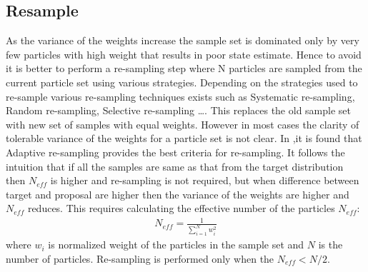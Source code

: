 \subsection{Resample}
As the variance of the weights increase the sample set is dominated only by very few particles with high weight that results in poor state estimate. Hence to avoid it is better to perform a re-sampling step where N particles are sampled from the current particle set using various strategies. Depending on the strategies used to re-sample various re-sampling techniques exists such as Systematic re-sampling, Random re-sampling, Selective re-sampling \dots. This replaces the old sample set with new set of samples with equal weights. However in most cases the clarity of tolerable variance of the weights for a particle set is not clear. In \cite{GMap_algo},it is found that Adaptive re-sampling provides the best criteria for re-sampling. It follows the intuition that if all the samples are same as that from the target distribution then ${N_{eff}}$ is higher and re-sampling is not required, but when difference between target and proposal are higher then the variance of the weights are higher and ${N_{eff}}$ reduces. This requires calculating the effective number of the particles ${N_{eff}}$:
\begin{gather} \label{Neff}
N_{eff} = \frac{1}{\sum_{i=1}^{N} w_{i}^{2} } 
\end{gather}
where ${w_{i}}$ is normalized weight of the particles in the sample set and ${N}$ is the number of particles.  Re-sampling is performed only 
when the ${N_{eff} < N/2}$.
